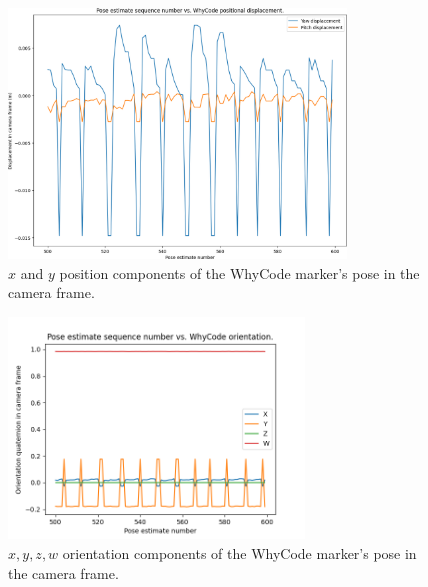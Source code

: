 \begin{figure}
    \centering
        \includegraphics[width=0.8\textwidth]{images/whycode_camera_pose_constrained.png}
        \caption{$x$ and $y$ position components of the WhyCode marker's pose in the camera frame.}
        \label{subfig:whycode_camera_position}
\end{figure}

\begin{figure}
    \centering
        \includegraphics[width=0.7\textwidth]{images/whycode_camera_orientation_constrained.png}
        \caption{$x,y,z,w$ orientation components of the WhyCode marker's pose in the camera frame.}
        \label{subfig:whycode_camera_orientation}
\end{figure}

